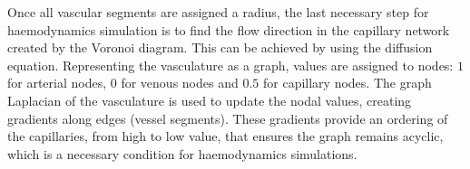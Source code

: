 \documentclass[11pt,]{article}
\begin{document}
Once all vascular segments are assigned a radius, the last necessary step for haemodynamics simulation is to find the flow direction in the capillary network created by the Voronoi diagram.
This can be achieved by using the diffusion equation.
Representing the vasculature as a graph, values are assigned to nodes: $1$ for arterial nodes, $0$ for venous nodes and $0.5$ for capillary nodes.
The graph Laplacian of the vasculature is used to update the nodal values, creating gradients along edges (vessel segments).
These gradients provide an ordering of the capillaries, from high to low value, that ensures the graph remains acyclic, which is a necessary condition for haemodynamics simulations.

\begin{figure} %
  \centering
  \begin{subfigure}[t]{.02\textwidth}
  \end{subfigure}
  \begin{subfigure}[t]{.95\textwidth}
    {
      \fontsize{3pt}{4pt}\selectfont%
      \def\svgwidth{\textwidth}    
    }
  \end{subfigure}
  \\
  \vspace{.5cm}
  \begin{subfigure}[t]{.02\textwidth}
  \end{subfigure}
  \begin{subfigure}[t]{.40\textwidth}
  \end{subfigure}

\end{figure}
\end{document}
